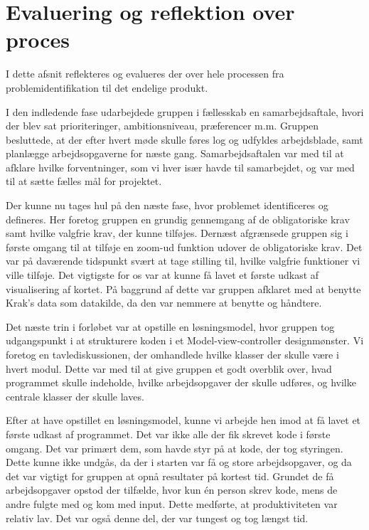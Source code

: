 \section{Evaluering og reflektion over proces}
\label{sec:evaluering_og_reflektion_over_proces}

I dette afsnit reflekteres og evalueres der over hele processen fra problemidentifikation til det endelige produkt. 

I den indledende fase udarbejdede gruppen i fællesskab en samarbejdsaftale, hvori der blev sat prioriteringer, ambitionsniveau, præferencer m.m. Gruppen besluttede, at der efter hvert møde skulle føres log og udfyldes arbejdsblade, samt planlægge arbejdsopgaverne for næste gang. Samarbejdsaftalen var med til at afklare hvilke forventninger, som vi hver især havde til samarbejdet, og var med til at sætte fælles mål for projektet.

Der kunne nu tages hul på den næste fase, hvor problemet identificeres og defineres. Her foretog gruppen en grundig gennemgang af de obligatoriske krav samt hvilke valgfrie krav, der kunne tilføjes. Dernæst afgrænsede gruppen sig i første omgang til at tilføje en zoom-ud funktion udover de obligatoriske krav. Det var på daværende tidspunkt svært at tage stilling til, hvilke valgfrie funktioner vi ville tilføje. Det vigtigste for os var at kunne få lavet et første udkast af visualisering af kortet. På baggrund af dette var gruppen afklaret med at benytte Krak's data som datakilde, da den var nemmere at benytte og håndtere.   

Det næste trin i forløbet var at opstille en løsningsmodel, hvor gruppen tog udgangspunkt i at strukturere koden i et Model-view-controller designmønster. Vi foretog en tavlediskussionen, der omhandlede hvilke klasser der skulle være i hvert modul. Dette var med til at give gruppen et godt overblik over, hvad programmet skulle indeholde, hvilke arbejdsopgaver der skulle udføres, og hvilke centrale klasser der skulle laves. 

Efter at have opstillet en løsningsmodel, kunne vi arbejde hen imod at få lavet et første udkast af programmet. Det var ikke alle der fik skrevet kode i første omgang. Det var primært dem, som havde styr på at kode, der tog styringen. Dette kunne ikke undgås, da der i starten var få og store arbejdsopgaver, og da det var vigtigt for gruppen at opnå resultater på kortest tid. Grundet de få arbejdsopgaver opstod der tilfælde, hvor kun én person skrev kode, mens de andre fulgte med og kom med input. Dette medførte, at produktiviteten var relativ lav. Det var også denne del, der var tungest og tog længst tid. 

